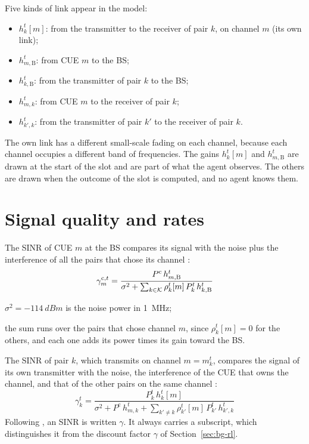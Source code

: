 Five kinds of link appear in the model:
\begin{itemize}[nosep]
  \item $h_k^t[m]$: from the transmitter to the receiver of pair $k$, on channel $m$ (its own link);
  \item $h_{m,\mathrm{B}}^t$: from \ac{CUE} $m$ to the \ac{BS};
  \item $h_{k,\mathrm{B}}^t$: from the transmitter of pair $k$ to the \ac{BS};
  \item $h_{m,k}^t$: from \ac{CUE} $m$ to the receiver of pair $k$;
  \item $h_{k',k}^t$: from the transmitter of pair $k'$ to the receiver of pair $k$.
\end{itemize}
The own link has a different small-scale fading on each channel, because each channel occupies a different
band of frequencies. The gains $h_k^t[m]$ and $h_{m,\mathrm{B}}^t$ are drawn at the start of the slot and
are part of what the agent observes. The others are drawn when the outcome of the slot is computed, and no
agent knows them.

\section{Signal quality and rates}
\label{sec:sm-sinr}

The \ac{SINR} of \ac{CUE} $m$ at the \ac{BS} compares its signal with the noise plus the interference of all
the pairs that chose its channel \cite[Eq.~5]{li+22fedmarl}:
\begin{equation}
  \gamma_m^{\mathrm{c},t} = \frac{P^{\mathrm{c}}\, h_{m,\mathrm{B}}^t}
    {\sigma^2 + \sum_{k \in \mathcal{K}} \rho_k^t[m]\, P_k^t\, h_{k,\mathrm{B}}^t}
  \label{eq:sm-sinr-cue}
\end{equation}
\begin{wherelist}
  \item $\sigma^2 = \SI{-114}{dBm}$ is the noise power in \SI{1}{\mega\hertz};
  \item the sum runs over the pairs that chose channel $m$, since $\rho_k^t[m] = 0$ for the others, and
    each one adds its power times its gain toward the \ac{BS}.
\end{wherelist}

The \ac{SINR} of pair $k$, which transmits on channel $m = m_k^t$, compares the signal of its own
transmitter with the noise, the interference of the \ac{CUE} that owns the channel, and that of the other
pairs on the same channel \cite[Eq.~6]{li+22fedmarl}:
\begin{equation}
  \gamma_k^t = \frac{P_k^t\, h_k^t[m]}
    {\sigma^2 + P^{\mathrm{c}}\, h_{m,k}^t + \sum_{k' \ne k} \rho_{k'}^t[m]\, P_{k'}^t\, h_{k',k}^t}
  \label{eq:sm-sinr-v2v}
\end{equation}
Following \citet{li+22fedmarl}, an \ac{SINR} is written $\gamma$. It always carries a subscript, which
distinguishes it from the discount factor $\gamma$ of Section~\ref{sec:bg-rl}.

